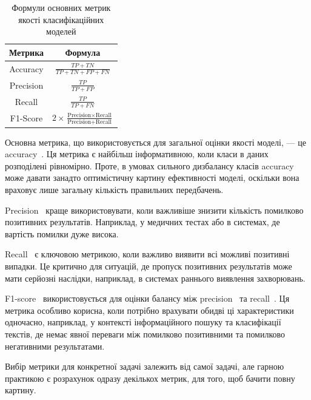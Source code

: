 \begin{table}[ht]
	\setfontsize{14pt}
	\caption{Формули основних метрик якості класифікаційних моделей}
	\label{tab_metrics}
	\centering
	\begin{tabular}{|c|c|}
		\hline
		Метрика & Формула \\
		\hline
		Accuracy & $\frac{TP + TN}{TP + TN + FP + FN}$ \\
		\hline
		Precision & $\frac{TP}{TP + FP}$ \\
		\hline
		Recall & $\frac{TP}{TP + FN}$ \\
		\hline
		F1-Score & $2 \times \frac{\text{Precision} \times \text{Recall}}{\text{Precision} + \text{Recall}}$ \\
		\hline
	\end{tabular}
\end{table}

Основна метрика, що використовується для загальної оцінки якості моделі, — це accuracy~\cite{ct6}. Ця метрика є найбільш інформативною, коли класи в даних розподілені рівномірно. Проте, в умовах сильного дизбалансу класів accuracy~\cite{ct6} може давати занадто оптимістичну картину ефективності моделі, оскільки вона враховує лише загальну кількість правильних передбачень.

Precision~\cite{ct6} краще використовувати, коли важливіше знизити кількість помилково позитивних результатів. Наприклад, у медичних тестах або в системах, де вартість помилки дуже висока.

Recall~\cite{ct7} є ключовою метрикою, коли важливо виявити всі можливі позитивні випадки. Це критично для ситуацій, де пропуск позитивних результатів може мати серйозні наслідки, наприклад, в системах раннього виявлення захворювань.

F1-score~\cite{ct8} використовується для оцінки балансу між precision~\cite{ct6} та recall~\cite{ct7}. Ця метрика особливо корисна, коли потрібно врахувати обидві ці характеристики одночасно, наприклад, у контексті інформаційного пошуку та класифікації текстів, де немає явної переваги між помилково позитивними та помилково негативними результатами.

Вибір метрики для конкретної задачі залежить від самої задачі, але гарною практикою є розрахунок одразу декількох метрик, для того, щоб бачити повну картину.

